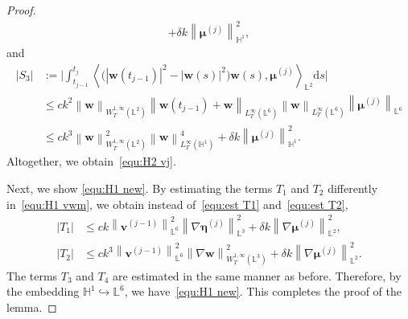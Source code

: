 \documentclass[10pt,a4paper]{amsart}
\newcommand{\abs}[1]{\left|{#1}\right|}
\newcommand{\bb}{\mathbb}
\newcommand{\bff}{\boldsymbol}
\newcommand{\ds}{\mathrm{d}s}
\newcommand{\inpro}[2]{\left\langle#1,#2\right\rangle}
\newcommand{\norm}[2]{\left\|{#1}\right\|_{#2}}
\begin{document}
\begin{proof}
\begin{align*}
		+
		\delta k
		\norm{\bff{\mu}^{(j)}}{\bb{H}^1}^2,
	\end{align*}
	and
	\begin{align*} 
		|S_3|
		&:=
		\Big|
		\int_{t_{j-1}}^{t_j} 
		\inpro{\big( |\bff{w}(t_{j-1})|^2 - |\bff{w}(s)|^2 \big)
			\bff{w}(s)}{\bff{\mu}^{(j)}}_{\bb{L}^2} \ds
		\Big|
		\\
		&\le
		c k^2
		\norm{\bff{w}}{W^{1,\infty}_T(\bb{L}^2)} 
		\norm{\bff{w}(t_{j-1})+\bff{w}}{L^\infty_T(\bb{L}^6)} 
		\norm{\bff{w}}{L^\infty_T(\bb{L}^6)} 
		\norm{\bff{\mu}^{(j)}}{\bb{L}^6} 
		\\
		&\le
		c k^3 
		\norm{\bff{w}}{W^{1,\infty}_T(\bb{L}^2)}^2 
		\norm{\bff{w}}{L^{\infty}_T(\bb{H}^1)}^4
		+
		\delta k
		\norm{\bff{\mu}^{(j)}}{\bb{H}^1}^2.
	\end{align*}
	Altogether, we obtain~\eqref{equ:H2 vj}.

    Next, we show \eqref{equ:H1 new}.
    By estimating the terms $T_1$ and $T_2$ differently in~\eqref{equ:H1 vwm}, we obtain instead of~\eqref{equ:est T1} and~\eqref{equ:est T2},
\begin{align*}
	\abs{T_1} &\leq
	ck \norm{\bff{v}^{(j-1)}}{\bb{L}^6}^2 \norm{\nabla \bff{\eta}^{(j)}}{\bb{L}^3}^2 
	+ \delta k\norm{\nabla \bff{\mu}^{(j)}}{\bb{L}^2}^2,
	\\
	\abs{T_2} &\leq
	ck^3 \norm{\bff{v}^{(j-1)}}{\bb{L}^6}^2 \norm{\nabla \bff{w}}{W^{1,\infty}_T(\bb{L}^3)}^2 
	+ \delta k \norm{\nabla \bff{\mu}^{(j)}}{\bb{L}^2}^2.
\end{align*}
    The terms $T_3$ and $T_4$ are estimated in the same manner as before. Therefore, by the embedding $\bb{H}^1 \hookrightarrow \bb{L}^6$, we have~\eqref{equ:H1 new}. This completes the proof of the lemma.
\end{proof}
\end{document}
